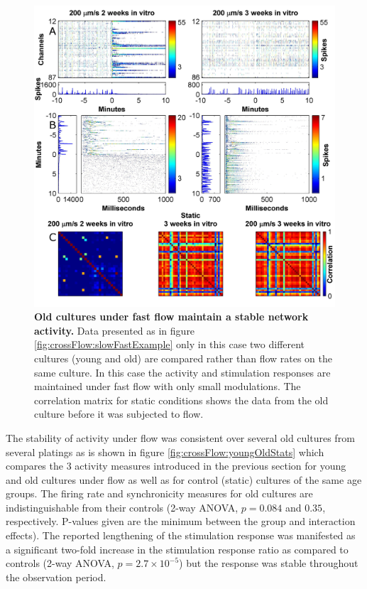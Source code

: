         \begin{figure}[!htb]
            \centering
            \includegraphics[width=15cm]{chapter5/figures/youngOldExample/youngOldRasterExample.jpg}
            \caption[Example for the effect of culture age on the network activity under flow]{\textbf{Old cultures under fast flow maintain a stable network activity.} Data presented as in figure \ref{fig:crossFlow:slowFastExample} only in this case two different cultures (young and old) are compared rather than flow rates on the same culture. In this case the activity and stimulation responses are maintained under fast flow with only small modulations. The correlation matrix for static conditions shows the data from the old culture before it was subjected to flow.}
            \label{fig:crossFlow:youngOldExampleRaster}
        \end{figure}

        The stability of activity under flow was consistent over several old cultures from several platings as is shown in figure \ref{fig:crossFlow:youngOldStats} which compares the 3 activity measures introduced in the previous section for  young and old cultures under flow as well as for control (static) cultures of the same age groups. The firing rate and synchronicity measures for old cultures are indistinguishable from their controls (2-way ANOVA, \(p=0.084\) and \(0.35\), respectively. P-values given are the minimum between the group and interaction effects). The reported lengthening of the stimulation response was manifested as a significant two-fold increase in the stimulation response ratio as compared to controls (2-way ANOVA, \(p=2.7\times 10^{-5}\)) but the response was stable throughout the observation period.

